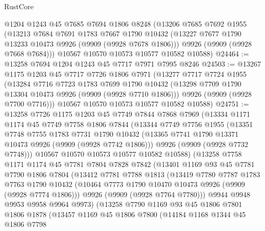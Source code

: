 \begin{lexlean}{RustCore}
\begin{coremodule}
    @1204
    @1243
    @45
    @7685
    @7694
    @1806
    @8248
    (@13206
      @7685
      @7692
      @1955
      (@13213
        @7684
        @7691
        @1783
        @7667
        @1790
        @10432
        (@13227 @7677 @1790 @13233 @10473 @9926 (@9909 (@9928 @7678 @1806)))
        @9926
        (@9909 (@9928 @7668 @7684)))
      @10567
      @10570
      @10573
      @10577
      @10582
      @10588)
@24464 := @13258 @7694 @1204 @1243 @45 @7717 @7971 @7995 @8246
@24503 := @13267
    @1175
    @1203
    @45
    @7717
    @7726
    @1806
    @7971
    (@13277
      @7717
      @7724
      @1955
      (@13284
        @7716
        @7723
        @1783
        @7699
        @1790
        @10432
        (@13298 @7709 @1790 @13304 @10473 @9926 (@9909 (@9928 @7710 @1806)))
        @9926
        (@9909 (@9928 @7700 @7716)))
      @10567
      @10570
      @10573
      @10577
      @10582
      @10588)
@24751 := @13258
    @7726
    @1175
    @1203
    @45
    @7749
    @7844
    @7868
    @7969
    (@13334
      @1171
      @1174
      @45
      @7749
      @7758
      @1806
      @7844
      (@13344
        @7749
        @7756
        @1955
        (@13351
          @7748
          @7755
          @1783
          @7731
          @1790
          @10432
          (@13365 @7741 @1790 @13371 @10473 @9926 (@9909 (@9928 @7742 @1806)))
          @9926
          (@9909 (@9928 @7732 @7748)))
        @10567
        @10570
        @10573
        @10577
        @10582
        @10588)
      (@13258
        @7758
        @1171
        @1174
        @45
        @7781
        @7804
        @7828
        @7842
        (@13401
          @1169
          @93
          @45
          @7781
          @7790
          @1806
          @7804
          (@13412
            @7781
            @7788
            @1813
            (@13419
              @7780
              @7787
              @1783
              @7763
              @1790
              @10432
              (@10464 @7773 @1790 @10470 @10473 @9926 (@9909 (@9928 @7774 @1806)))
              @9926
              (@9909 (@9928 @7764 @7780)))
            @9944
            @9948
            @9953
            @9958
            @9964
            @9973)
          (@13258
            @7790
            @1169
            @93
            @45
            @1806
            @7801
            @1806
            @1878
            (@13457
              @1169
              @45
              @1806
              @7800
              (@14184
                @1168
                @1344
                @45
                @1806
                @7798

\end{coremodule}
\end{lexlean}
